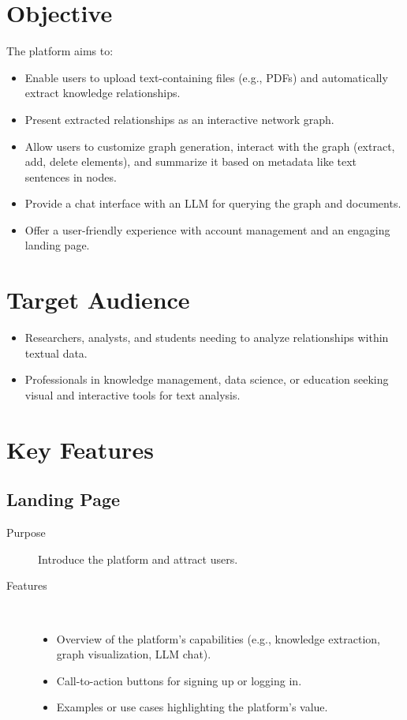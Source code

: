 \documentclass[%
 reprint,
 amsmath,amssymb,
 aps,
]{revtex4-2}
\begin{document}
\section{\label{sec:objective}Objective}

The platform aims to:
\begin{itemize}
\item Enable users to upload text-containing files (e.g., PDFs) and automatically extract knowledge relationships.
\item Present extracted relationships as an interactive network graph.
\item Allow users to customize graph generation, interact with the graph (extract, add, delete elements), and summarize it based on metadata like text sentences in nodes.
\item Provide a chat interface with an LLM for querying the graph and documents.
\item Offer a user-friendly experience with account management and an engaging landing page.
\end{itemize}

\section{\label{sec:target_audience}Target Audience}

\begin{itemize}
\item Researchers, analysts, and students needing to analyze relationships within textual data.
\item Professionals in knowledge management, data science, or education seeking visual and interactive tools for text analysis.
\end{itemize}

\section{\label{sec:key_features}Key Features}

\subsection{\label{sec:landing_page}Landing Page}
\begin{description}
\item[Purpose] Introduce the platform and attract users.
\item[Features] ~
\begin{itemize}
\item Overview of the platform's capabilities (e.g., knowledge extraction, graph visualization, LLM chat).
\item Call-to-action buttons for signing up or logging in.
\item Examples or use cases highlighting the platform's value.
\end{itemize}
\end{description}
\end{document}
